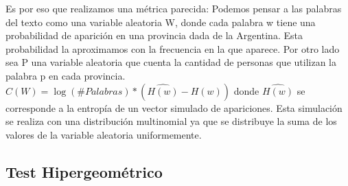 Es por eso que realizamos una métrica parecida:
Podemos pensar a las palabras del texto como una variable aleatoria W, donde cada palabra w tiene una probabilidad de aparición en una provincia dada de la Argentina. Esta probabilidad la aproximamos con la frecuencia en la que aparece.
Por otro lado sea P una variable aleatoria que cuenta la cantidad de personas que 
utilizan la palabra p en cada provincia.
$C(W) = \log(\#Palabras) * (\widehat{ H(w)} -  H(w)) $  donde
$\widehat{H(w)}$ se corresponde a la entropía de un vector simulado de apariciones.
Esta simulación se realiza con una distribución multinomial ya que se distribuye la 
suma de los valores de la variable aleatoria uniformemente. 



%

\subsection{Test Hipergeométrico}